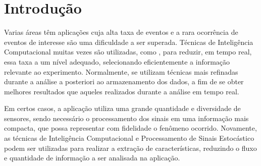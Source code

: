 \chapter{Introdução}
\label{cap:intro}
\glsresetall

Varias áreas têm aplicações cuja alta taxa de eventos e a rara ocorrência de
eventos de interesse são uma dificuldade a ser superada. Técnicas de
Inteligência Computacional muitas vezes são utilizadas, como ,
para reduzir, em tempo real, essa taxa a um nível adequado, selecionando eficientemente a
informação relevante ao experimento. Normalmente, se utilizam técnicas mais refinadas 
durante a análise a posteriori ao armazenamento dos dados, a fim de se obter
melhores resultados que aqueles realizados durante a análise em tempo real.

Em certos casos, a aplicação utiliza uma grande quantidade e diversidade de
sensores, sendo necessário o processamento dos sinais em uma informação mais
compacta, que possa representar com
fidelidade o fenômeno ocorrido. Novamente, as técnicas de Inteligência
Computacional e Processamento de Sinais Estocástico podem ser utilizadas para realizar a extração de
características, reduzindo o fluxo e quantidade de informação a ser analisada na aplicação.

